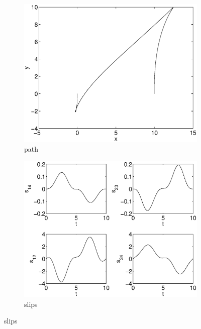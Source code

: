 \begin{figure}[h]
\begin{subfigure}[b]{\textwidth}
\centering
\includegraphics[height=0.3\textheight]{img/final_1_15_10_path.eps}
\caption{path}
\end{subfigure}

\begin{subfigure}[b]{\textwidth}
\centering
\includegraphics[height=0.3\textheight]{img/final_1_15_10_slips.eps}
\caption{slips}
\end{subfigure}


\end{figure}
